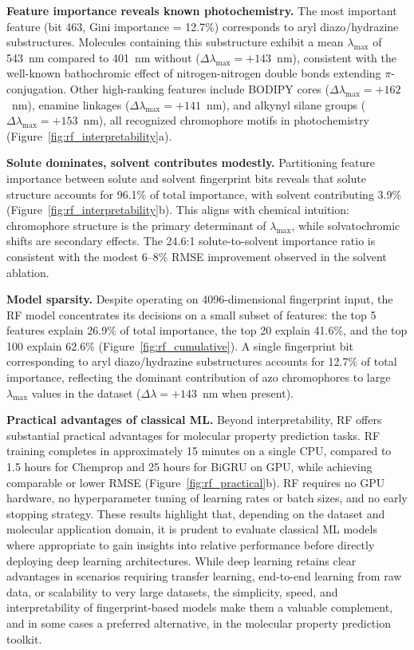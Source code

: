 \documentclass[journal=jcisd8,manuscript=article]{achemso}
\begin{document}
\textbf{Feature importance reveals known photochemistry.}
The most important feature (bit 463, Gini importance = 12.7\%) corresponds to aryl diazo/hydrazine substructures.
Molecules containing this substructure exhibit a mean $\lambda_{\max}$ of 543~nm compared to 401~nm without ($\Delta\lambda_{\max} = +143$~nm), consistent with the well-known bathochromic effect of nitrogen-nitrogen double bonds extending $\pi$-conjugation.
Other high-ranking features include BODIPY cores ($\Delta\lambda_{\max} = +162$~nm), enamine linkages ($\Delta\lambda_{\max} = +141$~nm), and alkynyl silane groups ($\Delta\lambda_{\max} = +153$~nm), all recognized chromophore motifs in photochemistry (Figure~\ref{fig:rf_interpretability}a).

\textbf{Solute dominates, solvent contributes modestly.}
Partitioning feature importance between solute and solvent fingerprint bits reveals that solute structure accounts for 96.1\% of total importance, with solvent contributing 3.9\% (Figure~\ref{fig:rf_interpretability}b).
This aligns with chemical intuition: chromophore structure is the primary determinant of $\lambda_{\max}$, while solvatochromic shifts are secondary effects.
The 24.6:1 solute-to-solvent importance ratio is consistent with the modest 6--8\% RMSE improvement observed in the solvent ablation.

\textbf{Model sparsity.}
Despite operating on 4096-dimensional fingerprint input, the RF model concentrates its decisions on a small subset of features: the top 5 features explain 26.9\% of total importance, the top 20 explain 41.6\%, and the top 100 explain 62.6\% (Figure~\ref{fig:rf_cumulative}).
A single fingerprint bit corresponding to aryl diazo/hydrazine substructures accounts for 12.7\% of total importance, reflecting the dominant contribution of azo chromophores to large $\lambda_{\max}$ values in the dataset ($\Delta\lambda = +143$~nm when present).

\textbf{Practical advantages of classical ML.}
Beyond interpretability, RF offers substantial practical advantages for molecular property prediction tasks.
RF training completes in approximately 15 minutes on a single CPU, compared to 1.5 hours for Chemprop and 25 hours for BiGRU on GPU, while achieving comparable or lower RMSE (Figure~\ref{fig:rf_practical}b).
RF requires no GPU hardware, no hyperparameter tuning of learning rates or batch sizes, and no early stopping strategy.
These results highlight that, depending on the dataset and molecular application domain, it is prudent to evaluate classical ML models where appropriate to gain insights into relative performance before directly deploying deep learning architectures.
While deep learning retains clear advantages in scenarios requiring transfer learning, end-to-end learning from raw data, or scalability to very large datasets, the simplicity, speed, and interpretability of fingerprint-based models make them a valuable complement, and in some cases a preferred alternative, in the molecular property prediction toolkit.
\end{document}
